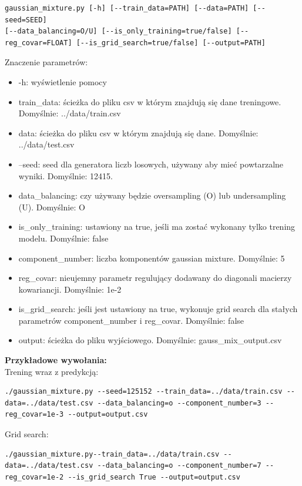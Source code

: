 \documentclass[12pt]{article}
\begin{document}
\begin{lstlisting}
gaussian_mixture.py [-h] [--train_data=PATH] [--data=PATH] [--seed=SEED]
[--data_balancing=O/U] [--is_only_training=true/false] [--reg_covar=FLOAT] [--is_grid_search=true/false] [--output=PATH]
\end{lstlisting}

Znaczenie parametrów:

\begin{itemize}
    \item -h: wyświetlenie pomocy
    \item train{\_}data: ścieżka do pliku csv w którym znajdują się dane treningowe. Domyślnie: ../data/train.csv
    \item data: ścieżka do pliku csv w którym znajdują się dane. Domyślnie: ../data/test.csv
    \item --seed: seed dla generatora liczb losowych, używany aby mieć powtarzalne wyniki. Domyślnie: 12415.
    \item data{\_}balancing: czy używany będzie oversampling (O) lub undersampling (U). Domyślnie: O
    \item is{\_}only{\_}training: ustawiony na true, jeśli ma zostać wykonany tylko trening modelu. Domyślnie: false
    \item component{\_}number: liczba komponentów gaussian mixture. Domyślnie: 5
    \item reg{\_}covar: nieujemny parametr regulujący dodawany do diagonali macierzy kowariancji. Domyślnie: 1e-2
    \item is{\_}grid{\_}search: jeśli jest ustawiony na true, wykonuje grid search dla stałych parametrów component{\_}number i reg{\_}covar. Domyślnie: false
    \item output: ścieżka do pliku wyjściowego. Domyślnie: gauss{\_}mix{\_}output.csv
\end{itemize}

\noindent \textbf{Przykładowe wywołania:}\\

\noindent Trening wraz z predykcją:
\begin{lstlisting}
./gaussian_mixture.py --seed=125152 --train_data=../data/train.csv --data=../data/test.csv --data_balancing=o --component_number=3 --reg_covar=1e-3 --output=output.csv
\end{lstlisting}

\noindent Grid search:
\begin{lstlisting}
./gaussian_mixture.py--train_data=../data/train.csv --data=../data/test.csv --data_balancing=o --component_number=7 --reg_covar=1e-2 --is_grid_search True --output=output.csv
\end{lstlisting}
\end{document}
